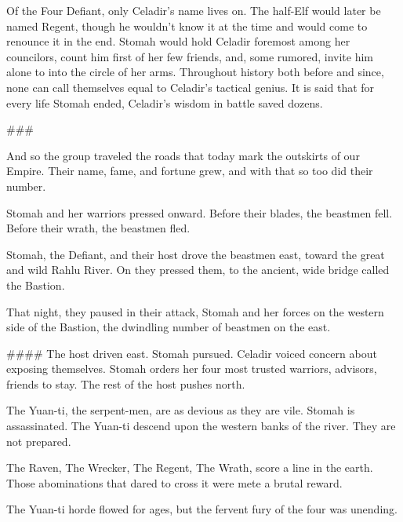Of the Four Defiant, only Celadir's name lives on.
The half-Elf would later be named Regent, though he wouldn't know it at the time
  and would come to renounce it in the end.
Stomah would hold Celadir foremost among her councilors,
  count him first of her few friends,
  and, some rumored, invite him alone to into the circle of her arms.
Throughout history both before and since, none can call themselves equal
  to Celadir's tactical genius.
It is said that for every life Stomah ended, Celadir's wisdom in battle saved dozens.

###

And so the group traveled the roads that today mark the outskirts of our Empire.
Their name, fame, and fortune grew, and with that so too did their number.

Stomah and her warriors pressed onward.
Before their blades, the beastmen fell.
Before their wrath, the beastmen fled.

Stomah, the Defiant, and their host drove the beastmen east,
  toward the great and wild Rahlu River.
On they pressed them, to the ancient, wide bridge called the Bastion.

That night, they paused in their attack, Stomah and her forces on the western side of the Bastion,
  the dwindling number of beastmen on the east.



####
The host driven east.
Stomah pursued.
Celadir voiced concern about exposing themselves.
Stomah orders her four most trusted warriors, advisors, friends to stay.
The rest of the host pushes north.

The Yuan-ti, the serpent-men, are as devious as they are vile.
Stomah is assassinated.
The Yuan-ti descend upon the western banks of the river.
They are not prepared.

The Raven, The Wrecker, The Regent, The Wrath, score a line in the earth.
Those abominations that dared to cross it were mete a brutal reward.

The Yuan-ti horde flowed for ages, but the fervent fury of the four was unending.
